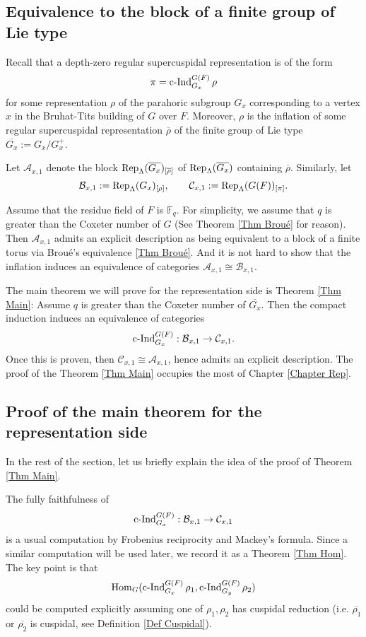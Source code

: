 \subsection{Equivalence to the block of a finite group of Lie type}

Recall that a depth-zero regular supercuspidal representation is of the form
$$\pi=\operatorname{\operatorname{c-Ind}}_{G_x}^{G(F)}\rho$$
for some representation $\rho$ of the parahoric subgroup $G_x$ corresponding to a vertex $x$ in the Bruhat-Tits building of $G$ over $F$. Moreover, $\rho$ is the inflation of some regular supercuspidal representation $\overline{\rho}$ of the finite group of Lie type $\overline{G_x}:=G_x/G_x^+$.

Let $\mathcal{A}_{x,1}$ denote the block $\operatorname{\operatorname{Rep}}_{\Lambda}(\overline{G_x})_{[\overline{\rho}]}$ of $\operatorname{\operatorname{Rep}}_{\Lambda}(\overline{G_x})$ containing $\overline{\rho}$. Similarly, let 
$$\mathcal{B}_{x,1}:=\operatorname{\operatorname{Rep}}_{\Lambda}(G_x)_{[\rho]},\qquad \mathcal{C}_{x,1}:=\operatorname{\operatorname{Rep}}_{\Lambda}(G(F))_{[\pi]}.$$

Assume that the residue field of $F$ is $\mathbb{F}_q$. For simplicity, we assume that $q$ is greater than the Coxeter number of $G$ (See Theorem \ref{Thm Broué} for reason). Then $\mathcal{A}_{x,1}$ admits an explicit description as being equivalent to a block of a finite torus via Broué's equivalence \ref{Thm Broué}. And it is not hard to show that the inflation induces an equivalence of categories $\mathcal{A}_{x,1} \cong \mathcal{B}_{x,1}$.

The main theorem we will prove for the representation side is Theorem \ref{Thm Main}: Assume $q$ is greater than the Coxeter number of $\overline{G_x}$. Then the compact induction induces an equivalence of categories
$$\operatorname{\operatorname{c-Ind}}_{G_x}^{G(F)}: \mathcal{B}_{x,1} \to \mathcal{C}_{x,1}.$$
Once this is proven, then $\mathcal{C}_{x,1} \cong \mathcal{A}_{x,1}$, hence admits an explicit description. The proof of the Theorem \ref{Thm Main} occupies the most of Chapter \ref{Chapter Rep}. 

\subsection{Proof of the main theorem for the representation side}

In the rest of the section, let us briefly explain the idea of the proof of Theorem \ref{Thm Main}.

The fully faithfulness of 
$$\operatorname{\operatorname{c-Ind}}_{G_x}^{G(F)}: \mathcal{B}_{x,1} \to \mathcal{C}_{x,1}$$
is a usual computation by Frobenius reciprocity and Mackey's formula. Since a similar computation will be used later, we record it as a Theorem \ref{Thm Hom}. The key point is that 
$$\operatorname{\operatorname{Hom}}_G(\operatorname{\operatorname{c-Ind}}_{G_x}^{G(F)}\rho_1, \operatorname{\operatorname{c-Ind}}_{G_y}^{G(F)}\rho_2)$$
could be computed explicitly assuming one of $\rho_1, \rho_2$ has cuspidal reduction (i.e. $\overline{\rho_1}$ or $\overline{\rho_2}$ is cuspidal, see Definition \ref{Def Cuspidal}). 

